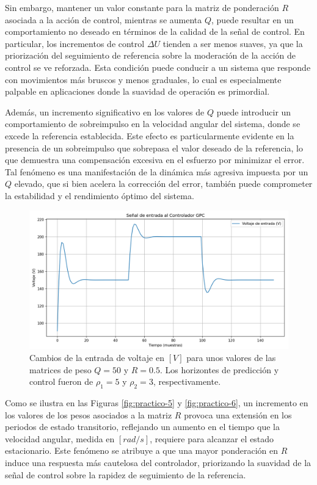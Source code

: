 \documentclass[journal]{IEEEtran}
\begin{document}
Sin embargo, mantener un valor constante para la matriz de ponderación \( R \) asociada a la acción de control, mientras se aumenta \( Q \), puede resultar en un comportamiento no deseado en términos de la calidad de la señal de control. En particular, los incrementos de control \( \Delta U \) tienden a ser menos suaves, ya que la priorización del seguimiento de referencia sobre la moderación de la acción de control se ve reforzada. Esta condición puede conducir a un sistema que responde con movimientos más bruscos y menos graduales, lo cual es especialmente palpable en aplicaciones donde la suavidad de operación es primordial.

Además, un incremento significativo en los valores de \( Q \) puede introducir un comportamiento de sobreimpulso en la velocidad angular del sistema, donde se excede la referencia establecida. Este efecto es particularmente evidente en la presencia de un sobreimpulso que sobrepasa el valor deseado de la referencia, lo que demuestra una compensación excesiva en el esfuerzo por minimizar el error. Tal fenómeno es una manifestación de la dinámica más agresiva impuesta por un \( Q \) elevado, que si bien acelera la corrección del error, también puede comprometer la estabilidad y el rendimiento óptimo del sistema.


\begin{figure}[H]
    \centering
    \includegraphics[width=1\linewidth]{imagen-4.png}
    \caption{Cambios de la entrada de voltaje en $[V]$ para unos valores de las matrices de peso $Q = 50$ y $R= 0.5$. Los horizontes de predicción y control fueron de $\rho_1 = 5$  y $\rho_2 = 3$, respectivamente. }
    \label{fig:practico-4}
\end{figure}

Como se ilustra en las Figuras \ref{fig:practico-5} y \ref{fig:practico-6}, un incremento en los valores de los pesos asociados a la matriz \( R \) provoca una extensión en los periodos de estado transitorio, reflejando un aumento en el tiempo que la velocidad angular, medida en \([rad/s]\), requiere para alcanzar el estado estacionario. Este fenómeno se atribuye a que una mayor ponderación en \( R \) induce una respuesta más cautelosa del controlador, priorizando la suavidad de la señal de control sobre la rapidez de seguimiento de la referencia.
\end{document}
